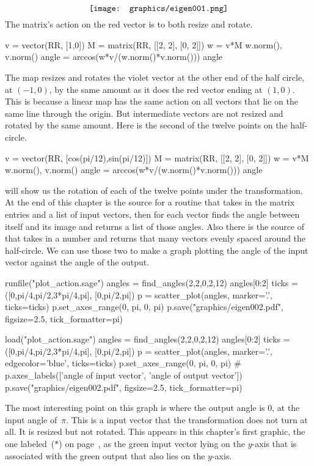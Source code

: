 \begin{equation*}
  \vcenteredhbox{\texttt{[image: graphics/eigen001.png]}}
\end{equation*}
The matrix's action on the red vector is to both resize and rotate.
\begin{sageoutput}
v = vector(RR, [1,0])
M = matrix(RR, [[2, 2], [0, 2]])
w = v*M
w.norm(), v.norm() 
angle = arccos(w*v/(w.norm()*v.norm())) 
angle 
\end{sageoutput}
\noindent The map resizes and rotates the violet vector at the other end of the 
half circle, at $(-1,0)$, by the
same amount as it does the red vector ending at $(1,0)$. 
This is because a linear map has the same action on 
all vectors that lie on the same line through the origin.
But intermediate vectors are not resized and rotated by the same
amount.
Here is the second of the twelve points on the half-circle.
\begin{sageoutput}
v = vector(RR, [cos(pi/12),sin(pi/12)])
M = matrix(RR, [[2, 2], [0, 2]])
w = v*M
w.norm(), v.norm() 
angle = arccos(w*v/(w.norm()*v.norm())) 
angle 
\end{sageoutput}

\Sage{} will show us the rotation of each of the twelve points 
under the transformation.
At the end of this chapter is the source for a routine 
that takes in the matrix entries and a list of input vectors, then
for each vector finds the angle between itself and its image and
returns a list of those angles.
Also there is the source of  that takes in a
number and returns that many vectors evenly spaced around the half-circle. 
We can use those two to make a graph plotting the angle of the input vector
against the angle of the output.
\begin{sageoutput}[d,0,1]
runfile("plot_action.sage")  
angles = find_angles(2,2,0,2,12)
angles[0:2]
ticks = ([0,pi/4,pi/2,3*pi/4,pi], [0,pi/2,pi])
p = scatter_plot(angles, marker='.', ticks=ticks)
p.set_axes_range(0, pi, 0, pi) 
p.save("graphics/eigen002.pdf", figsize=2.5, tick_formatter=pi)
\end{sageoutput}
\begin{sagesilent}
load("plot_action.sage")  
angles = find_angles(2,2,0,2,12)
angles[0:2]
ticks = ([0,pi/4,pi/2,3*pi/4,pi], [0,pi/2,pi])
p = scatter_plot(angles, marker='.', edgecolor='blue', ticks=ticks)
p.set_axes_range(0, pi, 0, pi) 
# p.axes_labels(['angle of input vector', 'angle of output vector'])
p.save("graphics/eigen002.pdf", figsize=2.5, tick_formatter=pi)
\end{sagesilent}
\begin{center}
\end{center}
The most interesting point on this graph is where the output angle is $0$,
at the input angle of~$\pi$.
This is a input vector that the transformation does not turn at all. 
It is resized but not rotated.
This appears in this chapter's first graphic, the one labeled~($*$)
on page~\pageref{gr:firstgraphic}, 
as the green input vector lying on the $y$-axis
that is associated with the green output that also lies on the $y$-axis.




